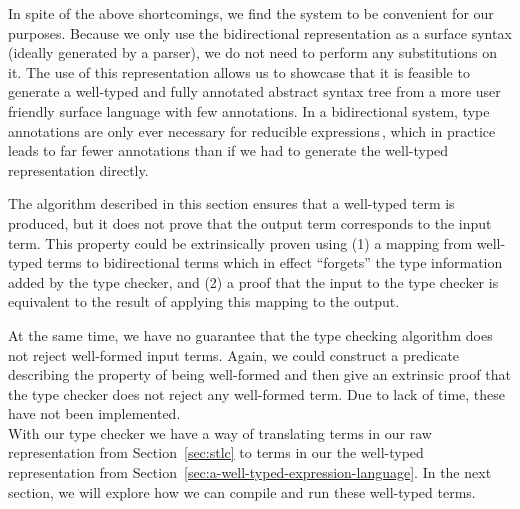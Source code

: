 In spite of the above shortcomings, we find the system to be convenient for our purposes. Because we only use the bidirectional representation as a surface syntax (ideally generated by a parser), we do not need to perform any substitutions on it. The use of this representation allows us to showcase that it is feasible to generate a well-typed and fully annotated abstract syntax tree from a more user friendly surface language with few annotations. In a bidirectional system, type annotations are only ever necessary for reducible expressions\,\cite{Dunfield13:bidir}, which in practice leads to far fewer annotations than if we had to generate the well-typed representation directly.

The algorithm described in this section ensures that a well-typed term is produced, but it does not prove that the output term corresponds to the input term. This property could be extrinsically proven using (1) a mapping from well-typed terms to bidirectional terms which in effect ``forgets'' the type information added by the type checker, and (2) a proof that the input to the type checker is equivalent to the result of applying this mapping to the output.

At the same time, we have no guarantee that the type checking algorithm does not reject well-formed input terms. Again, we could construct a predicate describing the property of being well-formed and then give an extrinsic proof that the type checker does not reject any well-formed term. Due to lack of time, these have not been implemented.\\

With our type checker we have a way of translating terms in our raw representation from Section~\ref{sec:stlc} to terms in our the well-typed representation from Section~\ref{sec:a-well-typed-expression-language}. In the next section, we will explore how we can compile and run these well-typed terms.

